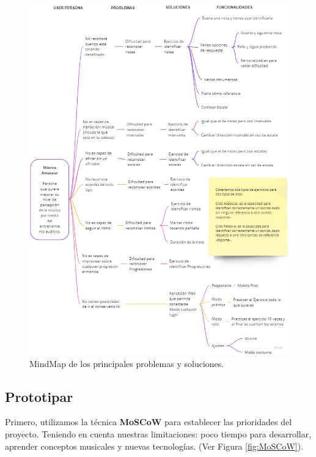 \documentclass[12pt,twoside,titlepage]{report}
\begin{document}
\begin{figure}[H]
    \centering
    \includegraphics[width=\textwidth]{Design Thinking/MindMap}
    \caption{MindMap de los principales problemas y soluciones.} 
    \label{fig:Mindmap}
\end{figure}

\subsection{Prototipar}
\label{sec:prototipar}

Primero, utilizamos la técnica \textbf{MoSCoW} \cite{moscow} para establecer las prioridades del proyecto. Teniendo en cuenta nuestras limitaciones: poco tiempo para desarrollar, aprender conceptos musicales y nuevas tecnologías. 
(Ver Figura \ref{fig:MoSCoW}).
\end{document}
